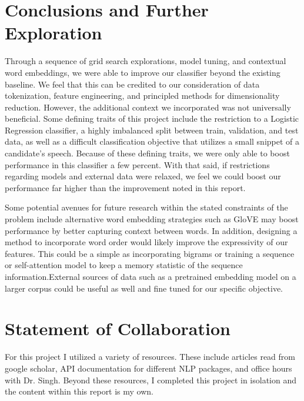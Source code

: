\documentclass[11pt,a4paper]{article}
\begin{document}
\section{Conclusions and Further Exploration}%
\label{sec:conclusion_and_further_exploration}

Through a sequence of grid search explorations, model tuning, and contextual word embeddings, we were able to improve our classifier beyond the existing baseline. We feel that this can be credited to our consideration of data tokenization, feature engineering, and principled methods for dimensionality reduction. However, the additional context we incorporated was not universally beneficial. Some defining traits of this project include the restriction to a Logistic Regression classifier, a highly imbalanced split between train, validation, and test data, as well as a difficult classification objective that utilizes a small snippet of a candidate's speech. Because of these defining traits, we were only able to boost performance in this classifier a few percent. With that said, if restrictions regarding models and external data were relaxed, we feel we could boost our performance far higher than the improvement noted in this report.

Some potential avenues for future research within the stated constraints of the problem include alternative word embedding strategies such as GloVE \cite{pennington2014glove} may boost performance by better capturing context between words. In addition, designing a method to incorporate word order would likely improve the expressivity of our features. This could be a simple as incorporating bigrams or training a sequence \cite{hochreiter1997long} or self-attention \cite{vaswani2017attention} model to keep a memory statistic of the sequence information.External sources of data such as a pretrained embedding model on a larger corpus could be useful as well and fine tuned for our specific objective.



\section{Statement of Collaboration}
For this project I utilized a variety of resources. These include articles read from google scholar, API documentation for different NLP packages,  and office hours with Dr. Singh. Beyond these resources, I completed this project in isolation and the content within this report is my own.






\appendix
\end{document}
